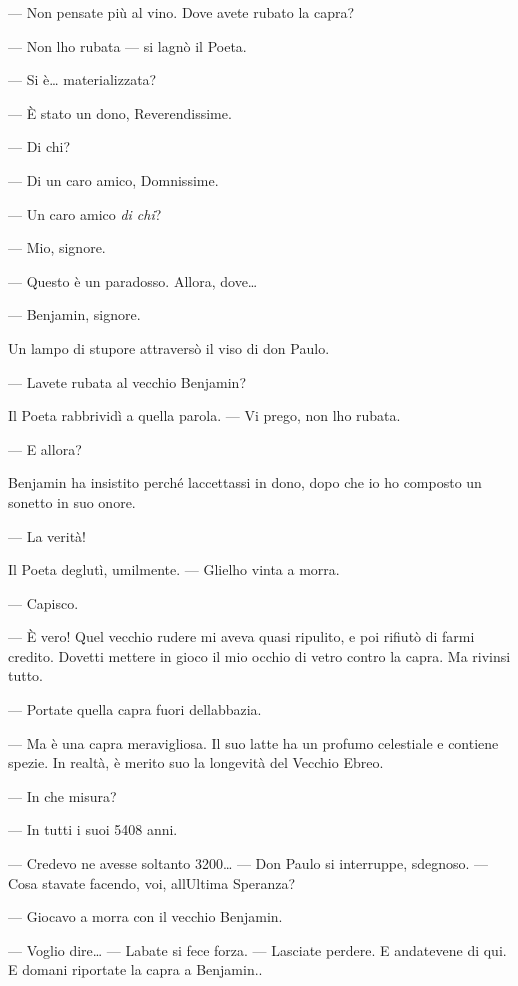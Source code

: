 --- Non pensate più al vino. Dove avete rubato la capra?

--- Non l\textquotesingle ho rubata --- si lagnò il Poeta.

--- Si è\ldots{} materializzata?

--- È stato un dono, Reverendissime.

--- Di chi?

--- Di un caro amico, Domnissime.

--- Un caro amico \emph{di chi}?

--- Mio, signore.

--- Questo è un paradosso. Allora, dove\ldots{}

--- Benjamin, signore.

Un lampo di stupore attraversò il viso di don Paulo.

--- L\textquotesingle avete rubata al vecchio Benjamin?

Il Poeta rabbrividì a quella parola. --- Vi prego, non
l\textquotesingle ho rubata.

--- E allora?

Benjamin ha insistito perché l\textquotesingle accettassi in dono, dopo
che io ho composto un sonetto in suo onore.

--- La verità!

Il Poeta deglutì, umilmente. --- Gliel\textquotesingle ho vinta a morra.

--- Capisco.

--- È vero! Quel vecchio rudere mi aveva quasi ripulito, e poi rifiutò
di farmi credito. Dovetti mettere in gioco il mio occhio di vetro contro
la capra. Ma rivinsi tutto.

--- Portate quella capra fuori dell\textquotesingle abbazia.

--- Ma è una capra meravigliosa. Il suo latte ha un profumo celestiale e
contiene spezie. In realtà, è merito suo la longevità del Vecchio Ebreo.

--- In che misura?

--- In tutti i suoi 5408 anni.

--- Credevo ne avesse soltanto 3200\ldots{} --- Don Paulo si interruppe,
sdegnoso. --- Cosa stavate facendo, voi, all\textquotesingle Ultima
Speranza?

--- Giocavo a morra con il vecchio Benjamin.

--- Voglio dire\ldots{} --- L\textquotesingle abate si fece forza. ---
Lasciate perdere. E andatevene di qui. E domani riportate la capra a
Benjamin..

